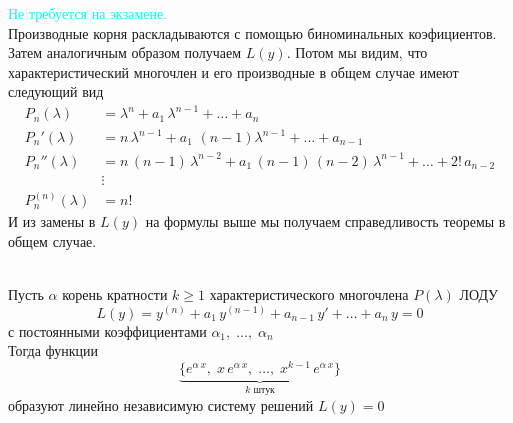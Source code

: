 \begin{Note}
    \textcolor{cyan}{Не требуется на экзамене.}\\
    Производные корня раскладываются с помощью биноминальных коэфициентов. Затем аналогичным образом получаем $L(y)$. Потом мы видим, что характеристический многочлен и его производные в общем случае имеют следующий вид
    \begin{align*}
    P_n(\lambda) &= \lambda^n + a_1\,\lambda^{n - 1} + \dots + a_n\\
    P_n'(\lambda) &= n\,\lambda^{n-1} + a_1\,\,(n - 1)\lambda^{n - 1} + \dots + a_{n-1}\\
    P_n''(\lambda) &= n\,(n-1)\,\lambda^{n - 2} + a_1\,(n-1)\,(n-2)\,\lambda^{n - 1} + \dots + 2!\,a_{n-2}\\
    &\vdots\\
    P_n^{(n)}(\lambda) &= n!
    \end{align*}
    И из замены в $L(y)$ на формулы выше мы получаем справедливость теоремы в общем случае.
\end{Note}
\begin{Th}~\\
    Пусть $\alpha$ корень кратности $k \geqslant 1$ характеристического многочлена $P(\lambda)$ ЛОДУ
    \[
        L(y)=y^{(n)}+a_1\,y^{(n-1)}+a_{n-1}\,y'+\dots+a_n\,y=0
    \]
    с постоянными коэффициентами $\alpha_1,\; \dots,\; \alpha_n$\\
    Тогда функции 
    \[
        \underbrace{\{e^{\alpha\,x},\; x\,e^{\alpha\,x},\; \dots,\; x^{k-1}\,e^{\alpha\,x}\}}_{k \text{ штук}}
    \]
    образуют линейно независимую систему решений $L(y)=0$
\end{Th}


